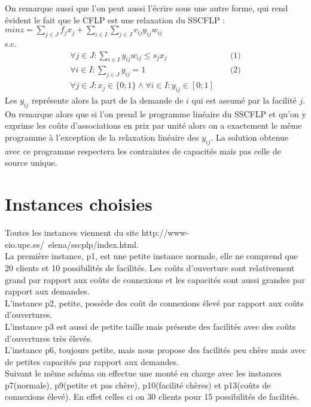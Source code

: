\documentclass[12pt,a4paper]{article}
\begin{document}
On remarque aussi que l'on peut aussi l’écrire sous une autre forme, qui rend évident le fait que le CFLP est une relaxation du SSCFLP :\\
$min z = \sum \limits_{j \in J} f_j x_j + \sum \limits_{i \in I} \sum \limits_{j \in J} c_{ij} y_{ij} w_{ij}$\\
s.c.
\begin{align*}
 \forall j \in J : \sum \limits_{i \in I} y_{ij} w_{ij} \leqslant s_j x_j & & \text{ (1)} \\
 \forall i \in I : \sum \limits_{j \in J} y_{ij} = 1 & & \text{ (2)} \\
 \forall j \in J : x_j \in \{0;1\} \land \forall i \in I : y_{ij} \in \left[ 0;1 \right]
\end{align*}
Les  $y_{ij}$ représente alors la part de la demande de $i$ qui est assumé par la facilité $j$. On remarque alors que si l'on prend le programme linéaire du SSCFLP et qu'on y exprime les coûts d'associations en prix par unité alors on a exactement le même programme à l’exception de la relaxation linéaire des $y_{ij}$. La solution obtenue avec ce programme respectera les contraintes de capacités mais pas celle de source unique.

\section{Instances choisies}

Toutes les instances viennent du site http://www-eio.upc.es/~elena/sscplp/index.html.\\

La première instance, p1, est une petite instance normale, elle ne comprend que 20 clients et 10 possibilités de facilités. Les coûts d'ouverture sont relativement grand par rapport aux coûts de connexions et les capacités sont aussi grandes par rapport aux demandes.\\

L'instance p2, petite, possède des coût de connexions élevé par rapport aux coûts d'ouvertures.\\

L'instance p3 est aussi de petite taille mais présente des facilités avec des coûts d'ouvertures très élevés.\\

L'instance p6, toujours petite, mais nous propose des facilités peu chère mais avec de petites capacités par rapport aux demandes.\\

Suivant le même schéma on effectue une monté en charge avec les instances p7(normale), p9(petite et pas chère), p10(facilité chères) et p13(coûts de connexions élevé). En effet celles ci on 30 clients pour 15 possibilités de facilités.\\
\end{document}
